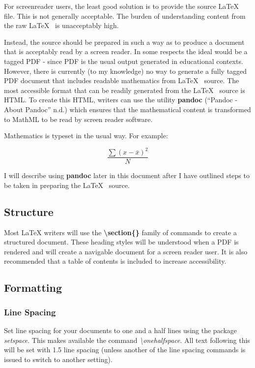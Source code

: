 \documentclass[]{article}
\begin{document}
For screenreader users, the least good solution is to provide the source
\LaTeX~ file. This is not generally acceptable. The burden of
understanding content from the raw \LaTeX~ is unacceptably high.

Instead, the source should be prepared in such a way as to produce a
document that is acceptably read by a screen reader. In some respects
the ideal would be a tagged PDF - since PDF is the usual output
generated in educational contexts. However, there is currently (to my
knowledge) no way to generate a fully tagged PDF document that includes
readable mathematics from \LaTeX~ source. The most accessible format
that can be readily generated from the \LaTeX~ source is HTML.  To create this HTML, 
writers can use the utility \textbf{pandoc} (``Pandoc - About
Pandoc'' n.d.) which ensures that the mathematical content is
transformed to MathML to be read by screen reader software. 

Mathematics is typeset in the usual way. For example:

\[\frac{\sum{(x-\bar{x})^2}}{N}\]

I will describe using \textbf{pandoc} later in this document after I
have outlined steps to be taken in preparing the \LaTeX~ source.

\hypertarget{structure}{%
\subsection{Structure}\label{structure}}

Most LaTeX writers will use the \textbf{\textbackslash{}section\{\}}
family of commands to create a structured document. These heading styles
will be understood when a PDF is rendered and will create a navigable
document for a screen reader user. It is also recommended that a table
of contents is included to increase accessibility.

\hypertarget{formatting}{%
\subsection{Formatting}\label{formatting}}

\hypertarget{linespacing}{%
\subsubsection{Line Spacing}\label{linespacing}}

Set line spacing for your documents to one and a half lines using the package \emph{setspace}.  This makes available the command
\emph{\textbackslash onehalfspace}.  All text following this will be set with 1.5 line spacing (unless another
of the line spacing commands is issued to switch to another setting).
\end{document}
